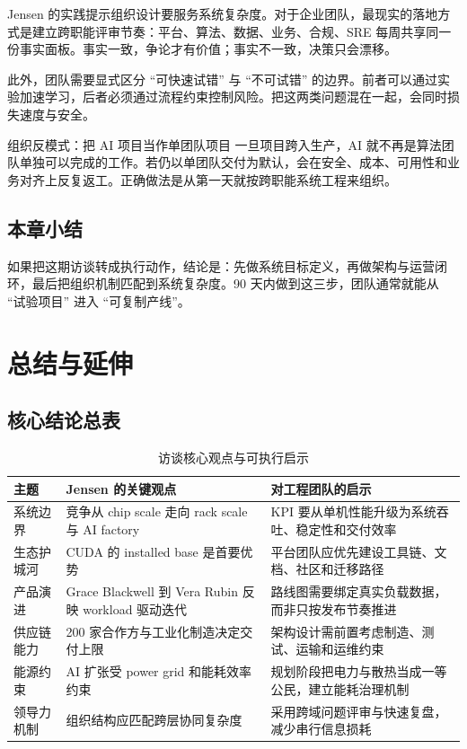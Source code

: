 \documentclass[a4paper]{article}
\begin{document}
Jensen 的实践提示组织设计要服务系统复杂度。对于企业团队，最现实的落地方式是建立跨职能评审节奏：平台、算法、数据、业务、合规、SRE 每周共享同一份事实面板。事实一致，争论才有价值；事实不一致，决策只会漂移。

此外，团队需要显式区分 ``可快速试错'' 与 ``不可试错'' 的边界。前者可以通过实验加速学习，后者必须通过流程约束控制风险。把这两类问题混在一起，会同时损失速度与安全。

\begin{warningbox}{组织反模式：把 AI 项目当作单团队项目}
一旦项目跨入生产，AI 就不再是算法团队单独可以完成的工作。若仍以单团队交付为默认，会在安全、成本、可用性和业务对齐上反复返工。正确做法是从第一天就按跨职能系统工程来组织。
\end{warningbox}

\subsection{本章小结}

如果把这期访谈转成执行动作，结论是：先做系统目标定义，再做架构与运营闭环，最后把组织机制匹配到系统复杂度。90 天内做到这三步，团队通常就能从 ``试验项目'' 进入 ``可复制产线''。

\section{总结与延伸}

\subsection{核心结论总表}

\begin{table}[H]
\centering
\caption{访谈核心观点与可执行启示}
\begin{tabular}{p{} p{} p{}}
\toprule
主题 & Jensen 的关键观点 & 对工程团队的启示 \\
\midrule
系统边界 & 竞争从 chip scale 走向 rack scale 与 AI factory & KPI 要从单机性能升级为系统吞吐、稳定性和交付效率 \\
\addlinespace
生态护城河 & CUDA 的 installed base 是首要优势 & 平台团队应优先建设工具链、文档、社区和迁移路径 \\
\addlinespace
产品演进 & Grace Blackwell 到 Vera Rubin 反映 workload 驱动迭代 & 路线图需要绑定真实负载数据，而非只按发布节奏推进 \\
\addlinespace
供应链能力 & 200 家合作方与工业化制造决定交付上限 & 架构设计需前置考虑制造、测试、运输和运维约束 \\
\addlinespace
能源约束 & AI 扩张受 power grid 和能耗效率约束 & 规划阶段把电力与散热当成一等公民，建立能耗治理机制 \\
\addlinespace
领导力机制 & 组织结构应匹配跨层协同复杂度 & 采用跨域问题评审与快速复盘，减少串行信息损耗 \\
\bottomrule
\end{tabular}
\end{table}
\end{document}
